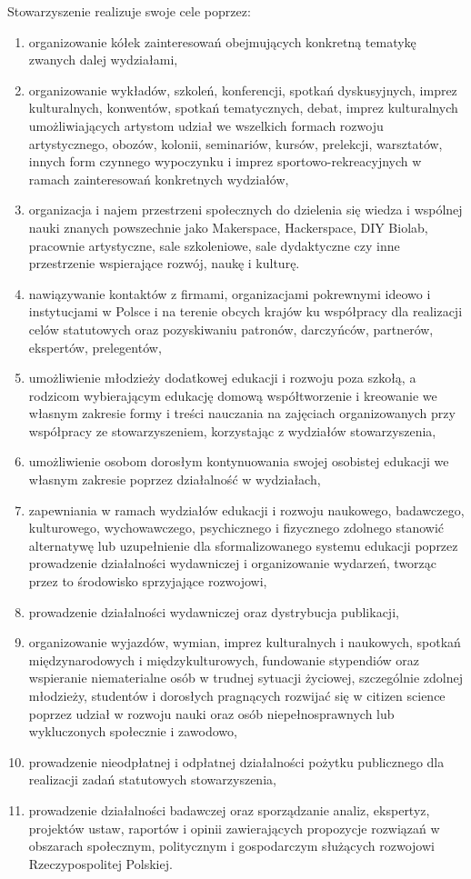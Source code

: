 \documentclass{article}
\begin{document}
Stowarzyszenie realizuje swoje cele poprzez:
\begin{enumerate}
\item
  organizowanie kółek zainteresowań obejmujących konkretną tematykę zwanych dalej wydziałami,
\item
  organizowanie wykładów, szkoleń, konferencji, spotkań dyskusyjnych, imprez kulturalnych, konwentów, spotkań tematycznych, debat, imprez kulturalnych umożliwiających artystom udział we wszelkich formach rozwoju artystycznego, obozów, kolonii, seminariów, kursów, prelekcji, warsztatów, innych form czynnego wypoczynku i imprez sportowo-rekreacyjnych w ramach zainteresowań konkretnych wydziałów,
\item
  organizacja i najem przestrzeni społecznych do dzielenia się wiedza i wspólnej nauki znanych powszechnie jako Makerspace, Hackerspace, DIY Biolab, pracownie artystyczne, sale szkoleniowe, sale dydaktyczne czy inne przestrzenie wspierające rozwój, naukę i kulturę.
\item
  nawiązywanie kontaktów z firmami, organizacjami pokrewnymi ideowo i instytucjami w Polsce i na terenie obcych krajów ku współpracy dla
  realizacji celów statutowych oraz pozyskiwaniu patronów, darczyńców, partnerów, ekspertów, prelegentów,
\item
  umożliwienie młodzieży dodatkowej edukacji i rozwoju poza szkołą, a rodzicom wybierającym edukację domową współtworzenie i kreowanie we własnym zakresie formy i treści nauczania na zajęciach organizowanych przy współpracy ze stowarzyszeniem, korzystając z wydziałów stowarzyszenia,
\item
  umożliwienie osobom dorosłym kontynuowania swojej osobistej edukacji we własnym zakresie poprzez działalność w wydziałach,
\item
  zapewniania w ramach wydziałów edukacji i rozwoju naukowego, badawczego, kulturowego, wychowawczego, psychicznego i fizycznego zdolnego stanowić alternatywę lub uzupełnienie dla sformalizowanego systemu edukacji poprzez prowadzenie działalności wydawniczej i organizowanie wydarzeń, tworząc przez to środowisko sprzyjające rozwojowi,
\item
  prowadzenie działalności wydawniczej oraz dystrybucja publikacji,
\item
  organizowanie wyjazdów, wymian, imprez kulturalnych i naukowych, spotkań międzynarodowych i międzykulturowych, fundowanie stypendiów oraz wspieranie niematerialne osób w trudnej sytuacji życiowej, szczególnie zdolnej młodzieży, studentów i dorosłych pragnących rozwijać się w citizen science poprzez udział w rozwoju nauki oraz osób niepełnosprawnych lub wykluczonych społecznie i zawodowo,
\item
  prowadzenie nieodpłatnej i odpłatnej działalności pożytku publicznego dla realizacji zadań statutowych stowarzyszenia,
\item
  prowadzenie działalności badawczej oraz sporządzanie analiz, ekspertyz, projektów ustaw, raportów i opinii zawierających propozycje rozwiązań w obszarach społecznym, politycznym i gospodarczym służących rozwojowi Rzeczypospolitej Polskiej.
\end{enumerate}
\end{document}
